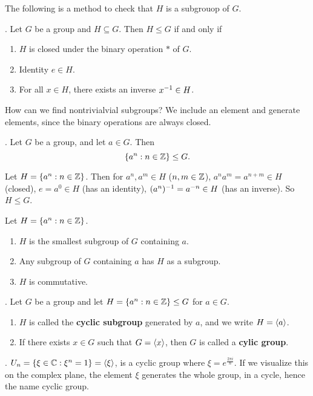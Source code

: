 The following is a method to check that \(H\) is a subgrouop of \(G\).

\thm. Let \(G\) be a group and \(H \subseteq G\). Then \(H \leq G\) if and only if
\begin{enumerate}
    \item \(H\) is closed under the binary operation \(*\) of \(G\).
    \item Identity \(e \in H\).
    \item For all \(x \in H\), there exists an inverse \(x^{-1} \in H\).
\end{enumerate}

How can we find nontrivialvial subgroups? We include an element and generate elements, since the binary operations are always closed.

\thm. Let \(G\) be a group, and let \(a \in G\). Then
\[
    \{a^n : n \in \mathbb{Z}\} \leq G.
\]

\pf Let \(H = \{a^n : n \in \mathbb{Z}\}\). Then for \(a^n, a^m \in H\) (\(n, m \in \mathbb{Z}\)), \(a^na^m = a^{n+m} \in H\) (closed), \(e = a^0 \in H\) (has an identity), \((a^n)^{-1} = a^{-n} \in H\) (has an inverse). So \(H \leq G\).

\rmk Let \(H = \{a^n : n \in \mathbb{Z}\}\).
\begin{enumerate}
    \item \(H\) is the smallest subgroup of \(G\) containing \(a\).
    \item Any subgroup of \(G\) containing \(a\) has \(H\) as a subgroup.
    \item \(H\) is commutative.
\end{enumerate}

.  Let \(G\) be a group and let \(H = \{a^n : n \in \mathbb{Z}\} \leq G\) for \(a \in G\).
\begin{enumerate}
    \item \(H\) is called the \textbf{cyclic subgroup} generated by \(a\), and we write \(H = \left\langle a \right\rangle\).
    \item If there exists \(x \in G\) such that \(G = \left\langle x \right\rangle\), then \(G\) is called a \textbf{cylic group}.
\end{enumerate}

\ex. \(U_n = \{\xi \in \mathbb{C} : \xi^n = 1\} = \left\langle \xi \right\rangle\), is a cyclic group where \(\xi = e^{\frac{2\pi i}{n}}\). If we visualize this on the complex plane, the element \(\xi\) generates the whole group, in a cycle, hence the name cyclic group.
\pagebreak

